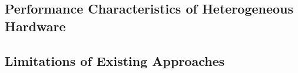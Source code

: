 \subsection{Performance Characteristics of Heterogeneous Hardware}

\subsection{Limitations of Existing Approaches}
